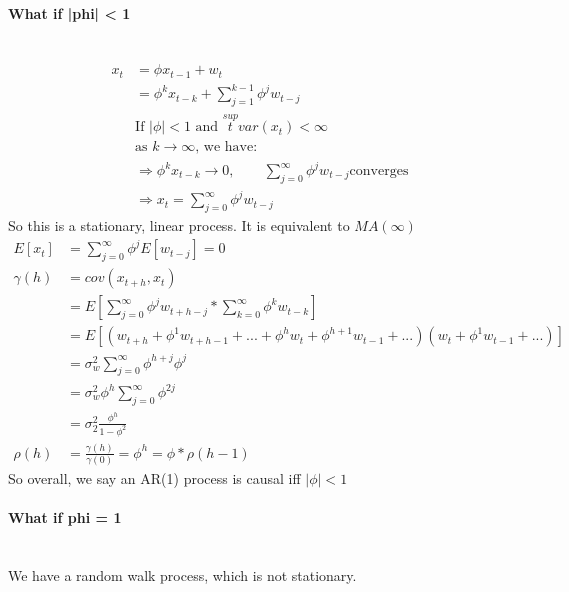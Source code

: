 \paragraph{What if |phi| < 1} \mbox{}\\
    \begin{align*}
        x_t 
        & =  \phi x_{t-1} + w_t \\
        & = \phi^k x_{t-k} + \sum_{j=1}^{k-1}\phi^j w_{t-j} \\
        & \textrm{If $|\phi| < 1$ and $\overset{sup}{t} var(x_t) < \infty$}\\
        & \textrm{as $k \to \infty$, we have: }\\
        & \Longrightarrow \phi^k x_{t-k} \to 0, \qquad \sum_{j=0}^\infty \phi^j w_{t-j} \textrm{converges} \\
        & \Longrightarrow x_t = \sum_{j=0}^\infty \phi^j w_{t-j}
    \end{align*}
So this is a stationary, linear process. It is equivalent to $MA(\infty)$
    \begin{align*}
        E[x_t] & =  \sum_{j=0}^\infty \phi^j E[w_{t-j}] = 0\\
        \gamma(h) & = cov(x_{t+h}, x_t) \\
            & = E\left[\sum_{j=0}^\infty \phi^j w_{t+h-j} * \sum_{k=0}^\infty \phi^k w_{t-k}\right]\\
            &= E\left[(w_{t+h} + \phi^1 w_{t+h-1} + ... + \phi^h w_{t} + \phi^{h+1}w_{t-1} + ...)(w_{t} + \phi^1 w_{t-1} + ...)\right]\\
            &= \sigma_w^2 \sum_{j=0}^\infty \phi^{h+j} \phi^j \tag{$E[w_iw_j]=0$ if $i\neq j$}\\
            & = \sigma_w^2 \phi^h \sum_{j=0}^\infty \phi^{2j}\\
            &= \sigma_2^2 \frac{\phi^h}{1 - \phi^2}\\
        \rho(h) 
            &= \frac{\gamma(h)}{\gamma(0)} = \phi^h = \phi*\rho(h-1)
    \end{align*}
So overall, we say an AR(1) process is causal iff $|\phi| < 1$

\paragraph{What if phi = 1}\mbox{}\\
We have a random walk process, which is not stationary. 
    
    

